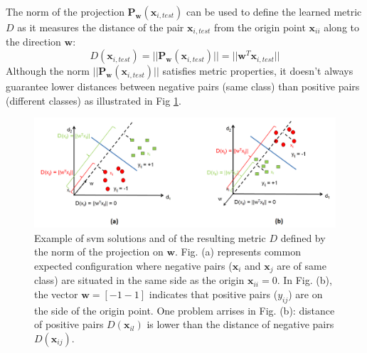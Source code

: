 \noindent The norm of the projection $\textbf{P}_\textbf{w}(\textbf{x}_{i,test})$ can be used to define the learned metric $D$ as it measures the distance of the pair $\textbf{x}_{i,test}$ from the origin point $\textbf{x}_{ii}$ along to the direction $\textbf{w}$:
\begin{equation}
	D(\textbf{x}_{i,test}) = ||\textbf{P}_\textbf{w}(\textbf{x}_{i,test})|| = ||\textbf{w}^T\textbf{x}_{i,test}||
\end{equation}
Although the norm $||\textbf{P}_\textbf{w}(\textbf{x}_{i,test})||$ satisfies metric properties, it doesn’t always guarantee lower distances between negative pairs (same class) than positive pairs (different classes) as illustrated in Fig \ref{fig:Dissimilarity_def_norm_scalar_product}. 

\begin{figure}[h!]
	\centering
	\includegraphics[width=1\linewidth]{images/Dissimilarity_def_norm_scalar_product}
	\caption{Example of {\sc svm} solutions and of the resulting metric $D$ defined by the norm of the projection on $\textbf{w}$. Fig. (a) represents common expected configuration where negative pairs ($\textbf{x}_i$ and $\textbf{x}_j$ are of same class) are situated in the same side as the origin $\textbf{x}_{ii}=0$. In Fig. (b), the vector $\textbf{w}=[-1 -1]$ indicates that positive pairs ($y_{ij}$) are on the side of the origin point. One problem arrises in Fig. (b): distance of positive pairs $D(\textbf{x}_{il})$ is lower than the distance of negative pairs $D(\textbf{x}_{ij})$.}
	\label{fig:Dissimilarity_def_norm_scalar_product}
\end{figure}


